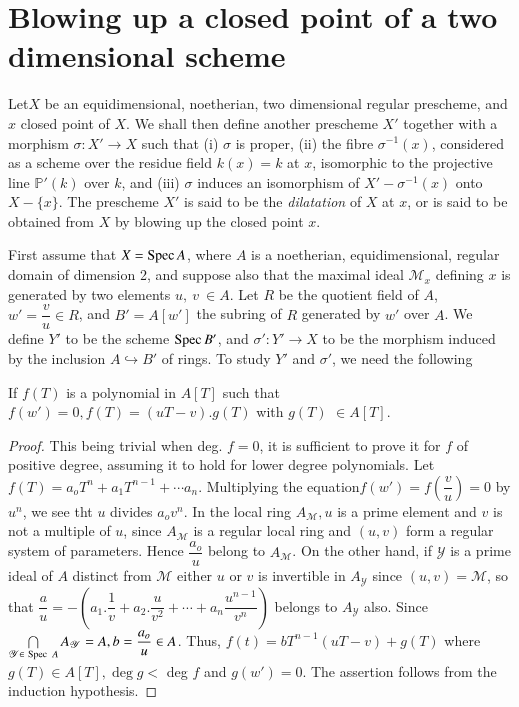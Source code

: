 

\chapter{Blowing up a closed point of a two dimensional scheme}\label{chap2}%


Let\pageoriginale $X$ be an equidimensional, noetherian, two dimensional regular
pre\-scheme, and $x$  closed point of $X$. We shall then define another
prescheme $X'$ together with a morphism $\sigma : X' \rightarrow X$
such that (i) $\sigma$ is proper, (ii) the fibre $\sigma^{-1} (x)$,
considered as a scheme over the residue field $k(x) = k$ at $x$,
isomorphic to the projective line $\mathbb{P}'(k)$ over $k$, and (iii)
$\sigma$ induces an isomorphism of $X' - \sigma^{-1}(x)$ onto $X - \{
x \}$. The prescheme $X'$ is said to be the \textit{dilatation} of $X$
at $x$, or is said to be obtained from $X$ by blowing up the closed
point $x$.  

First assume that $X = \operatorname{Spec} A$, where $A$ is a noetherian,
equidimensional, regular domain of dimension 2, and suppose also
that the maximal ideal $\mathcal{M}_x$ defining $x$ is generated by
two elements $u,~ v~ \in A$. Let $R$ be the quotient field of $A$, $w' =
\dfrac{v}{u} \in R$, and $B' = A [w']$ the subring of $R$ generated by
$w'$ over $A$. We define $Y'$ to be the  
scheme $\operatorname{Spec} B'$, and $\sigma ' : Y' \rightarrow X$ to be the
morphism induced by the inclusion $A \hookrightarrow B'$ of rings. To
study $Y'$ and $\sigma '$, we need the following  

\begin{lemma*}
  If $f(T)$ is a polynomial in $A [T]$ such that $f(w') = 0, f(T) =
  (u T- v ). g (T)$ with $g(T)$ $ \in A [T]$. 
\end{lemma*}

\begin{proof}
  This being trivial when deg. $f = 0$, it is sufficient to prove it
  for $f$ of positive degree, assuming it to hold for lower degree
  polynomials. Let $f(T) = a_o T^n + a_1 T^{n-1} + \cdots
  a_n$. Multiplying the equation\pageoriginale $f(w') = f
  \left(\dfrac{v}{u}\right) = 0$ by 
  $u^n$, we see tht $u$ divides $a_o v^n$. In the local ring
  $A_{\mathcal{M}}, u$ is a prime element and $v$ is not a multiple of
  $u$, since $A_{\mathcal{M}}$ is a regular local ring and $(u,v)$ form
  a regular system of parameters. Hence $\dfrac{a_o}{u}$ belong to
  $A_{\mathcal{M}}$. On the other hand, if $\mathscr{Y}$ is a prime ideal of
  $A$ distinct from $\mathcal{M}$ either $u$ or $v$ is invertible in $
  A_{\mathscr{Y}}$ since $(u,v) = \mathcal{M}$, so that $\dfrac{a}{u}
  = - \left(a_1. \dfrac{1}{v} + a_2 . \dfrac{u}{v^2} + \cdots + a_n \dfrac
  {u^{n-1}}{v^n}\right)$ belongs to $A_{\mathscr{Y}}$ also. Since
  $\bigcap\limits_{\mathscr{Y} \in ~ \operatorname{Spec} ~ A} A_{\mathscr{Y}} = A, b
  = \dfrac{a_o}{u} \in A$. Thus, $f(t) = b T^{n-1} (uT-v) + g(T)$
  where $g(T) \in A [T], \deg g < $ deg $f$ and $g(w') = 0$. The
  assertion follows from the induction hypothesis. 
\end{proof}

